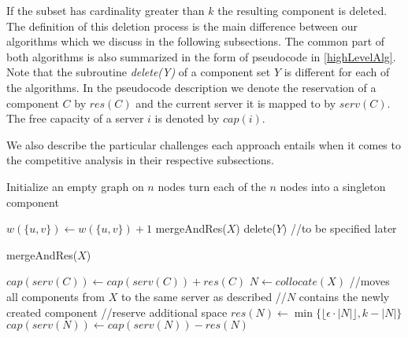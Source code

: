 \documentclass[a4paper, 10pt]{article}
\newcommand{\crep}{\text{C{\scriptsize REP}}}
\theoremstyle{definition}
\begin{document}
	If the subset has cardinality greater than $k$ the resulting component is deleted. The definition of this deletion process is the main difference between our algorithms which we discuss in the following subsections. The common part of both algorithms is also summarized in the form of pseudocode in \cref{highLevelAlg}. Note that the subroutine \textit{delete(Y)} of a component set $Y$ is different for each of the algorithms. 
	In the pseudocode description we denote the reservation of a component $C$ by $res(C)$ and the current server it is mapped to by $serv(C)$. The free capacity of a server $i$ is denoted by $cap(i)$.
	
	We also describe the particular challenges each approach entails when it comes to the competitive analysis in their respective subsections.
	
	\begin{algorithm}[t]
		\caption{\crep{}}
		\label{highLevelAlg}
		\begin{algorithmic}
			\STATE Initialize an empty graph on $n$ nodes
			\STATE turn each of the $n$ nodes into a singleton component
			
			\STATE $w(\{u,v\})\gets w(\{u,v\})+1$
			\ENDIF
			\STATE mergeAndRes($X$)
			\ENDIF
			\STATE delete($Y$) //to be specified later
			\ENDIF	
			
			\ENDFOR
			
		\end{algorithmic}
	\end{algorithm}

\begin{algorithm}[t]
	\caption{mergeAndRes($X$)}
	\label{mergeAndRes}
	\begin{algorithmic}
		\FORALL { $C\in X$}
		\STATE $cap(serv(C))\gets cap(serv(C))+res(C)$		
		\ENDFOR
		\STATE $N\gets collocate(X)$ //moves all components from $X$ to the same server as described
		\STATE //$N$ contains the newly created component
		\IF {$|N|>2/\epsilon$}
		\STATE //reserve additional space
		\STATE $res(N)\gets\min\{\lfloor\epsilon\cdot|N|\rfloor,k-|N|\}$
		\STATE $cap(serv(N))\gets cap(serv(N))-res(N)$
		\ENDIF	
		
		
	\end{algorithmic}
\end{algorithm}
	
\end{document}
